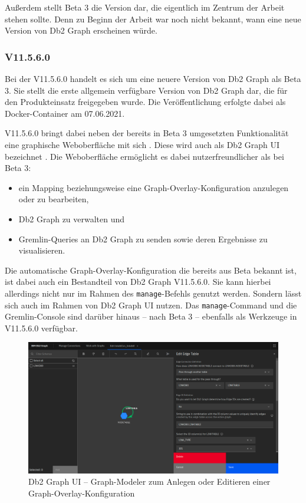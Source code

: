 Außerdem stellt Beta 3 die Version dar, die eigentlich im Zentrum der Arbeit stehen sollte. Denn zu Beginn der Arbeit war noch nicht bekannt, wann eine neue Version von Db2 Graph erscheinen würde. 

\subsubsection{V11.5.6.0}

Bei der V11.5.6.0 handelt es sich um eine neuere Version von Db2 Graph als Beta 3. Sie stellt die erste allgemein verfügbare Version von Db2 Graph dar, die für den Produkteinsatz freigegeben wurde. Die Veröffentlichung erfolgte dabei als Docker-Container am 07.06.2021. 

V11.5.6.0 bringt dabei neben der bereits in Beta 3 umgesetzten Funktionalität eine graphische Weboberfläche mit sich \cite{ibm_docs_db2_graph_ui}. Diese wird auch als Db2 Graph UI bezeichnet \cite{ibm_docs_db2_graph_ui}. Die Weboberfläche ermöglicht es dabei nutzerfreundlicher als bei Beta 3: 

\begin{itemize}
    \item ein Mapping beziehungsweise eine Graph-Overlay-Konfiguration anzulegen oder zu bearbeiten,
    \item Db2 Graph zu verwalten und 
    \item Gremlin-Queries an Db2 Graph zu senden sowie deren Ergebnisse zu visualisieren. 
\end{itemize}

Die automatische Graph-Overlay-Konfiguration die bereits aus Beta bekannt ist, ist dabei auch ein Bestandteil von Db2 Graph V11.5.6.0. Sie kann hierbei allerdings nicht nur im Rahmen des \texttt{manage}-Befehls genutzt werden. Sondern lässt sich auch im Rahmen von Db2 Graph UI nutzen. Das \texttt{manage}-Command und die Gremlin-Console sind darüber hinaus -- nach Beta 3 -- ebenfalls als Werkzeuge in V11.5.6.0 verfügbar.

\begin{figure}[ht]
    \centering
    \includegraphics[width=\textwidth]{images/db2_graph_editor.png}
    \vspace{0.1em}
    \caption[Db2 Graph UI -- Graph-Modeler]{Db2 Graph UI -- Graph-Modeler zum Anlegen oder Editieren einer Graph-Overlay-Konfiguration}
    \label{fig:db2_graph_ui_editor}
\end{figure}

